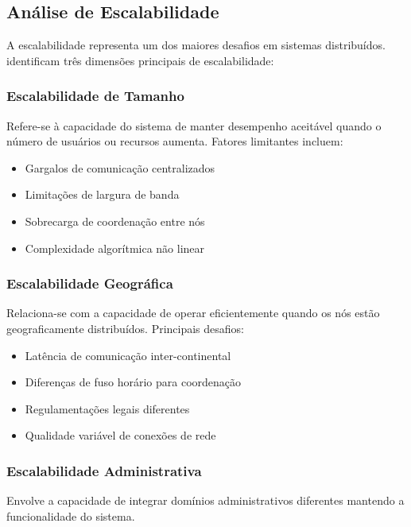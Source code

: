 \subsection{Análise de Escalabilidade}

A escalabilidade representa um dos maiores desafios em sistemas distribuídos.  identificam três dimensões principais de escalabilidade:

\subsubsection{Escalabilidade de Tamanho}

Refere-se à capacidade do sistema de manter desempenho aceitável quando o número de usuários ou recursos aumenta. Fatores limitantes incluem:

\begin{itemize}
    \item Gargalos de comunicação centralizados
    \item Limitações de largura de banda
    \item Sobrecarga de coordenação entre nós
    \item Complexidade algorítmica não linear
\end{itemize}

\subsubsection{Escalabilidade Geográfica}

Relaciona-se com a capacidade de operar eficientemente quando os nós estão geograficamente distribuídos. Principais desafios:

\begin{itemize}
    \item Latência de comunicação inter-continental
    \item Diferenças de fuso horário para coordenação
    \item Regulamentações legais diferentes
    \item Qualidade variável de conexões de rede
\end{itemize}

\subsubsection{Escalabilidade Administrativa}

Envolve a capacidade de integrar domínios administrativos diferentes mantendo a funcionalidade do sistema.


